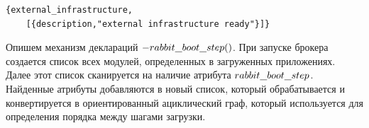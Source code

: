 \begin{lstlisting}
{external_infrastructure,
    [{description,"external infrastructure ready"}]}
\end{lstlisting}
Опишем механизм деклараций $-rabbit\underline{\hspace{0.25cm}}boot\underline{\hspace{0.25cm}}step()$. При запуске брокера создается список всех модулей, определенных в загруженных приложениях. Далее этот список сканируется на наличие атрибута $rabbit\underline{\hspace{0.25cm}}boot\underline{\hspace{0.25cm}}step$. Найденные атрибуты добавляются в новый список, который обрабатывается и конвертируется в ориентированный ациклический граф, который используется для определения порядка между шагами загрузки.


\printbibliography[heading=bibintoc
    ,title=Библиография
]


